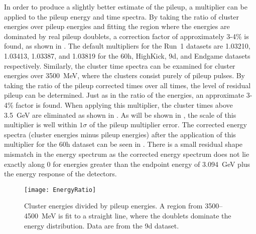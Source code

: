In order to produce a slightly better estimate of the pileup, a multiplier can be applied to the pileup energy and time spectra. By taking the ratio of cluster energies over pileup energies and fitting the region where the energies are dominated by real pileup doublets, a correction factor of approximately 3-4\% is found, as shown in . The default multipliers for the Run~1 datasets are 1.03210, 1.03413, 1.03387, and 1.03819 for the 60h, HighKick, 9d, and Endgame datasets respectively. Similarly, the cluster time spectra can be examined for cluster energies over \SI{3500}{\MeV}, where the clusters consist purely of pileup pulses. By taking the ratio of the pileup corrected times over all times, the level of residual pileup can be determined. Just as in the ratio of the energies, an approximate 3-4\% factor is found. When applying this multiplier, the cluster times above \SI{3.5}{\GeV} are eliminated as shown in . As will be shown in , the scale of this multiplier is well within $1\sigma$ of the pileup multiplier error. The corrected energy spectra (cluster energies minus pileup energies) after the application of this multiplier for the 60h dataset can be seen in . There is a small residual shape mismatch in the energy spectrum as the corrected energy spectrum does not lie exactly along 0 for energies greater than the endpoint energy of \SI{3.094}{\GeV} plus the energy response of the detectors. 


    \begin{figure}
        \centering
        \texttt{[image: EnergyRatio]}
        \caption[Cluster energies divided by pileup energies]{Cluster energies divided by pileup energies. A region from \SI{3500}{}--\SI{4500}{\MeV} is fit to a straight line, where the doublets dominate the energy distribution. Data are from the 9d dataset.}
        \label{fig:EnergyRatio}
    \end{figure}


